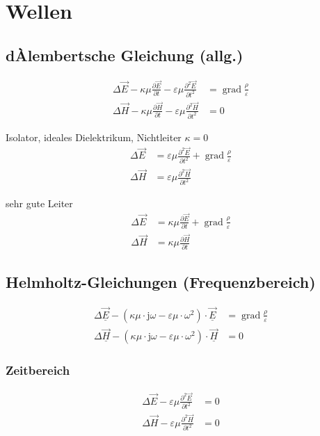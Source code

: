 \section{Wellen}
\subsection{dÀlembertsche Gleichung (allg.)}

\begin{align*}
    \Delta \vec{E}-\kappa \mu \frac{\partial \vec{E}}{\partial t}-\varepsilon \mu \frac{\partial^{2} \vec{E}}{\partial t^{2}} & = \operatorname{grad} \frac{\rho}{\varepsilon} \\
    \Delta \vec{H}-\kappa \mu \frac{\partial \vec{H}}{\partial t}-\varepsilon \mu \frac{\partial^{2} \vec{H}}{\partial t^{2}} & = 0
\end{align*}

Isolator, ideales Dielektrikum, Nichtleiter $\kappa = 0$
\begin{align*}
    \Delta \vec{E} & =\varepsilon \mu \frac{\partial^{2} \vec{E}}{\partial t^{2}}+\operatorname{grad} \frac{\rho}{\varepsilon} \\
    \Delta \vec{H} & =\varepsilon \mu \frac{\partial^{2} \vec{H}}{\partial t^{2}}
\end{align*}

sehr gute Leiter
\begin{align*}
    \Delta \vec{E} & =\kappa \mu \frac{\partial \vec{E}}{\partial t}+\operatorname{grad} \frac{\rho}{\varepsilon} \\
    \Delta \vec{H} & =\kappa \mu \frac{\partial \vec{H}}{\partial t}
\end{align*}

\subsection{Helmholtz-Gleichungen (Frequenzbereich)}
\begin{align*}
    \Delta \underline{\vec{E}}-\left(\kappa \mu \cdot \mathrm{j} \omega-\varepsilon \mu \cdot \omega^{2}\right) \cdot \underline{\vec{E}} & = \operatorname{grad} \frac{\rho}{\varepsilon} \\
    \Delta \underline{\vec{H}}-\left(\kappa \mu \cdot \mathrm{j} \omega-\varepsilon \mu \cdot \omega^{2}\right) \cdot \underline{\vec{H}} & = 0
\end{align*}

\subsubsection{Zeitbereich}
\begin{align*}
    \Delta \vec{E}-\varepsilon \mu \frac{\partial^{2} \vec{E}}{\partial t^{2}} & =0 \\
    \Delta \vec{H}-\varepsilon \mu \frac{\partial^{2} \vec{H}}{\partial t^{2}} & =0
\end{align*}

